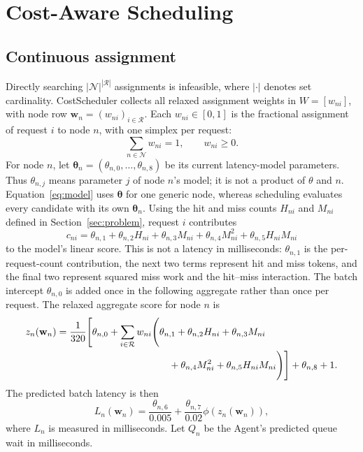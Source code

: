 \documentclass[10pt]{article}
\newcommand{\method}{CostScheduler\xspace}
\begin{document}
\section{Cost-Aware Scheduling}
\label{sec:algorithm}

\subsection{Continuous assignment}

Directly searching $|\mathcal{N}|^{|\mathcal{R}|}$ assignments is infeasible,
where $|\cdot|$ denotes set cardinality. \method collects all relaxed
assignment weights in $W=[w_{ni}]$, with node row
$\mathbf{w}_n=(w_{ni})_{i\in\mathcal{R}}$. Each $w_{ni}\in[0,1]$ is the
fractional assignment of request $i$ to node $n$, with one simplex per request:
\begin{equation}
  \sum_{n\in\mathcal{N}} w_{ni}=1,\qquad w_{ni}\ge 0.
  \label{eq:simplex}
\end{equation}
For node $n$, let
$\boldsymbol{\theta}_n=(\theta_{n,0},\ldots,\theta_{n,8})$ be its current
latency-model parameters. Thus $\theta_{n,j}$ means parameter $j$ of node
$n$'s model; it is not a product of $\theta$ and $n$. Equation~\ref{eq:model}
uses $\boldsymbol{\theta}$ for one generic node, whereas scheduling evaluates
every candidate with its own $\boldsymbol{\theta}_n$. Using the hit and miss
counts $H_{ni}$ and $M_{ni}$ defined in Section~\ref{sec:problem}, request $i$
contributes
\begin{equation}
  c_{ni}=\theta_{n,1}
    +\theta_{n,2}H_{ni}
    +\theta_{n,3}M_{ni}
    +\theta_{n,4}M_{ni}^2
    +\theta_{n,5}H_{ni}M_{ni}
  \label{eq:request-cost}
\end{equation}
to the model's linear score. This is not a latency in milliseconds:
$\theta_{n,1}$ is the per-request-count contribution, the next two terms
represent hit and miss tokens, and the final two represent squared miss work
and the hit--miss interaction. The batch intercept $\theta_{n,0}$ is added
once in the following aggregate rather than once per request. The relaxed
aggregate score for node $n$ is
\begin{equation*}
\begin{aligned}
  z_n(\mathbf{w}_n)
    &=\frac{1}{320}\Biggl[\theta_{n,0}
      +\sum_{i\in\mathcal{R}}w_{ni}\Biggl(
        \theta_{n,1}
        +\theta_{n,2}H_{ni}
        +\theta_{n,3}M_{ni}
        \\[-0.1em]
    &\hspace{11.5em}
        +\theta_{n,4}M_{ni}^2
        +\theta_{n,5}H_{ni}M_{ni}
      \Biggr)\Biggr]+\theta_{n,8}+1.
\end{aligned}
\end{equation*}
The predicted batch latency is then
\begin{equation*}
  L_n(\mathbf{w}_n)
    =\frac{\theta_{n,6}}{0.005}
      +\frac{\theta_{n,7}}{0.02}
       \phi\!\left(z_n(\mathbf{w}_n)\right),
\end{equation*}
where $L_n$ is measured in milliseconds. Let $Q_n$ be the Agent's predicted
queue wait in milliseconds.
\end{document}
